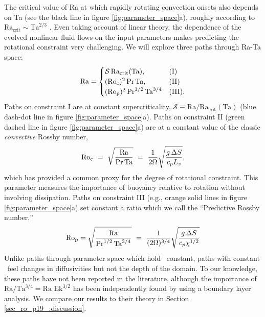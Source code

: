 The critical value of Ra at which rapidly rotating convection onsets also depends on Ta (see the black line in figure \ref{fig:parameter_space}a),
roughly according to $\text{Ra}_{\text{crit}} \sim \text{Ta}^{2/3}$ \citep{Chandrasekhar,calkins&all2015a}.
Even taking account of linear theory, the dependence of the evolved nonlinear fluid 
flows on the input parameters makes predicting the rotational constraint very challenging. 
We will explore three paths through Ra-Ta space:
\begin{equation}
    \text{Ra} = 
    \begin{cases}
    \mathcal{S}\,\text{Ra}_\text{crit}(\text{Ta}), & (\text{I})\\
    (\text{Ro}_{\text{c}})^2 \, \text{Pr}\, \text{Ta}, & (\text{II}) \\
    (\text{Ro}_{\text{p}})^2\, \text{Pr}^{1/2}\, \text{Ta}^{3/4} & (\text{III}).
    \end{cases}
    \label{eqn:ro_p19_paths}
\end{equation}
Paths on constraint I are at constant supercriticality, 
$\mathcal{S} \equiv \text{Ra}/\text{Ra}_{\text{crit}}(\text{Ta})$
(blue dash-dot line in figure \ref{fig:parameter_space}a).
Paths on constraint II (green dashed line in figure \ref{fig:parameter_space}a)
are at a constant value of the classic
\textit{convective} Rossby number, 
\begin{equation}
\con \ = \   \sqrt{ \frac{\text{Ra}}{\text{Pr}\, \text{Ta} } } \ 
= \  \frac{1}{2 \Omega } \sqrt{\frac{g \, \Delta  S}{c_{p} L_{z}}},
\label{eqn:ro_p19_roc_defn}
\end{equation}
which has provided \citep[e.g., ][]{julien&all1996, brummell&all1996} 
a common proxy for the degree of rotational constraint.
This parameter measures the importance of buoyancy relative to rotation without 
involving dissipation.  
Paths on constraint
III (e.g., orange solid lines in figure \ref{fig:parameter_space}a) 
set constant a ratio which we call the ``Predictive Rossby number,'' 
\begin{equation}
\text{Ro}_{\text{p}} = \sqrt{\frac{\text{Ra}}{\text{Pr}^{1/2}\,\text{Ta}^{3/4}}} \ = \    
\frac{1}{(2 \Omega)^{3/4}} \sqrt{\frac{g \, \Delta  S}{c_{p} \chi^{1/2}}}
\label{eqn:ro_p19_rop_defn}
\end{equation}
Unlike paths through parameter space which hold \con$\,$ constant,
paths with constant \pro$\,$ 
feel changes in diffusivities but not the depth of the domain.
To our knowledge, these paths have not been reported in the literature, 
although the importance of $\text{Ra}/\text{Ta}^{3/4} = \text{Ra Ek}^{3/2}$
has been independently found by \cite{king&all2012} using a boundary layer
analysis. We compare our results to their theory in Section \ref{sec_ro_p19_:discussion}. 

